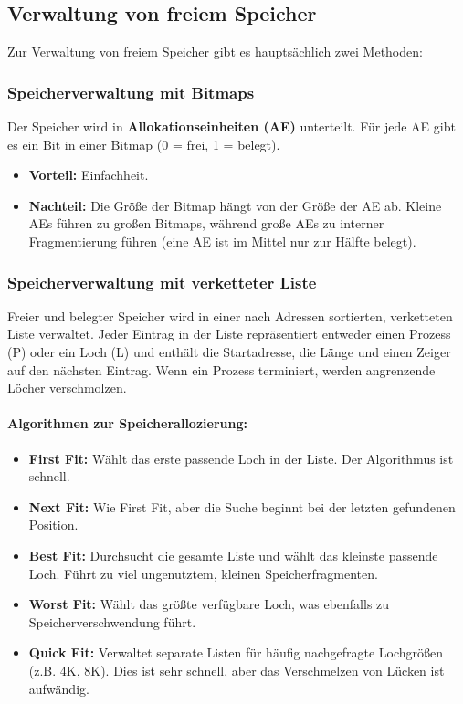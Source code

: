 \subsection{Verwaltung von freiem Speicher}
Zur Verwaltung von freiem Speicher gibt es hauptsächlich zwei Methoden:

\subsubsection{Speicherverwaltung mit Bitmaps}
Der Speicher wird in \textbf{Allokationseinheiten (AE)} unterteilt. Für jede AE gibt es ein Bit in einer Bitmap (0 = frei, 1 = belegt).
\begin{itemize}
    \item \textbf{Vorteil:} Einfachheit.
    \item \textbf{Nachteil:} Die Größe der Bitmap hängt von der Größe der AE ab. Kleine AEs führen zu großen Bitmaps, während große AEs zu interner Fragmentierung führen (eine AE ist im Mittel nur zur Hälfte belegt).
\end{itemize}

\subsubsection{Speicherverwaltung mit verketteter Liste}
Freier und belegter Speicher wird in einer nach Adressen sortierten, verketteten Liste verwaltet. Jeder Eintrag in der Liste repräsentiert entweder einen Prozess (P) oder ein Loch (L) und enthält die Startadresse, die Länge und einen Zeiger auf den nächsten Eintrag. Wenn ein Prozess terminiert, werden angrenzende Löcher verschmolzen.

\paragraph{Algorithmen zur Speicherallozierung:}
\begin{itemize}
    \item \textbf{First Fit:} Wählt das erste passende Loch in der Liste. Der Algorithmus ist schnell.
    \item \textbf{Next Fit:} Wie First Fit, aber die Suche beginnt bei der letzten gefundenen Position.
    \item \textbf{Best Fit:} Durchsucht die gesamte Liste und wählt das kleinste passende Loch. Führt zu viel ungenutztem, kleinen Speicherfragmenten.
    \item \textbf{Worst Fit:} Wählt das größte verfügbare Loch, was ebenfalls zu Speicherverschwendung führt.
    \item \textbf{Quick Fit:} Verwaltet separate Listen für häufig nachgefragte Lochgrößen (z.B. 4K, 8K). Dies ist sehr schnell, aber das Verschmelzen von Lücken ist aufwändig.
\end{itemize}

